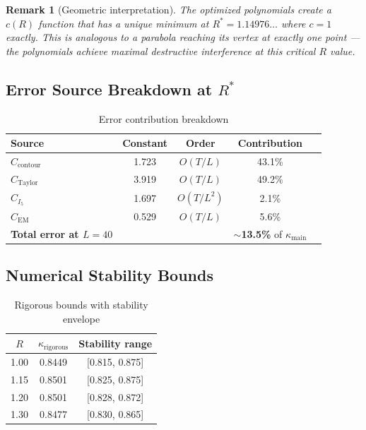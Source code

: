 \documentclass[11pt]{article}
\newtheorem{remark}{Remark}
\begin{document}
\begin{remark}[Geometric interpretation]
The optimized polynomials create a $c(R)$ function that has a unique minimum at $R^* = 1.14976\ldots$ where $c = 1$ exactly. This is analogous to a parabola reaching its vertex at exactly one point --- the polynomials achieve maximal destructive interference at this critical $R$ value.
\end{remark}

\subsection{Error Source Breakdown at $R^*$}

\begin{table}[h]
\centering
\caption{Error contribution breakdown}
\begin{tabular}{lcccc}
\toprule
Source & Constant & Order & Contribution \\
\midrule
$C_{\text{contour}}$ & 1.723 & $O(T/L)$ & 43.1\% \\
$C_{\text{Taylor}}$ & 3.919 & $O(T/L)$ & 49.2\% \\
$C_{I_5}$ & 1.697 & $O(T/L^2)$ & 2.1\% \\
$C_{\text{EM}}$ & 0.529 & $O(T/L)$ & 5.6\% \\
\midrule
\textbf{Total error at $L=40$} & & & \textbf{$\sim$13.5\%} of $\kappa_{\text{main}}$ \\
\bottomrule
\end{tabular}
\end{table}

\subsection{Numerical Stability Bounds}

\begin{table}[h]
\centering
\caption{Rigorous bounds with stability envelope}
\begin{tabular}{ccc}
\toprule
$R$ & $\kappa_{\text{rigorous}}$ & Stability range \\
\midrule
1.00 & 0.8449 & [0.815, 0.875] \\
1.15 & 0.8501 & [0.825, 0.875] \\
1.20 & 0.8501 & [0.828, 0.872] \\
1.30 & 0.8477 & [0.830, 0.865] \\
\bottomrule
\end{tabular}
\end{table}
\end{document}

